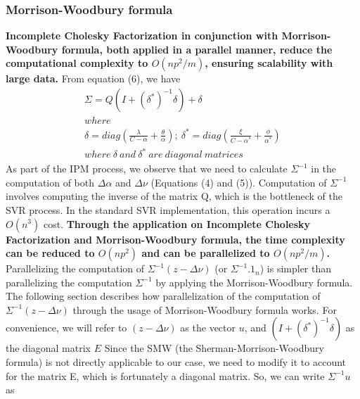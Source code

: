 \documentclass[12pt]{article}
\begin{document}
\subsubsection{Morrison-Woodbury formula}  
\label{Morrison-Woodbury formula}
  {\bf Incomplete Cholesky Factorization in conjunction with Morrison-Woodbury formula, both applied in a parallel manner, reduce the computational complexity to $O(np^2/m)$, ensuring scalability with large data.}
  \newline\newline
From equation (6), we have
\begin{gather*} \Sigma={Q(I+(\delta^*)^{-1}\delta) + \delta}\\
where \\
\delta=diag(\frac{\lambda}{C-\alpha} + \frac{\theta}{\alpha});\   \delta^*=diag(\frac{\xi}{C-\alpha^*} + \frac{\phi}{\alpha^*})\\
where\ \delta \ and\ \delta^* \ are\ diagonal\ matrices
\end{gather*} 
As part of the IPM process, we observe that we need to calculate $\Sigma^{-1}$ in the computation of both $\Delta \alpha$ and $\Delta \nu$ (Equations (4) and (5)). Computation of $\Sigma^{-1}$ involves computing the inverse of the matrix Q, which is the bottleneck of the SVR process. In the standard SVR implementation, this operation incurs a $O(n^3)$ cost. 
\newline\newline
{\bf Through the application on Incomplete Cholesky Factorization and Morrison-Woodbury formula, the time complexity can be reduced to $O(np^2)$ and can be parallelized to $O(np^2/m)$.}
\newline
\newline 
Parallelizing the computation of $\Sigma^{-1}(z - \Delta\nu)$ (or $\Sigma^{-1}.1_{n}$) is simpler than parallelizing the computation $\Sigma^{-1}$ by applying the Morrison-Woodbury formula. 
The following section describes how parallelization of the computation of $\Sigma^{-1}(z - \Delta\nu)$ through the usage of Morrison-Woodbury formula works.
\newline\newline
For convenience, we will refer to $(z - \Delta\nu)$ as the vector $u$, and $(I+(\delta^*)^{-1}\delta)$ as the diagonal matrix $E$
\newline\newline
Since the SMW (the Sherman-Morrison-Woodbury formula) is not directly applicable to our case, we need to modify it to account for the matrix E, which is fortunately a diagonal matrix. So, we can write $\Sigma^{-1}u$ as
\end{document}
